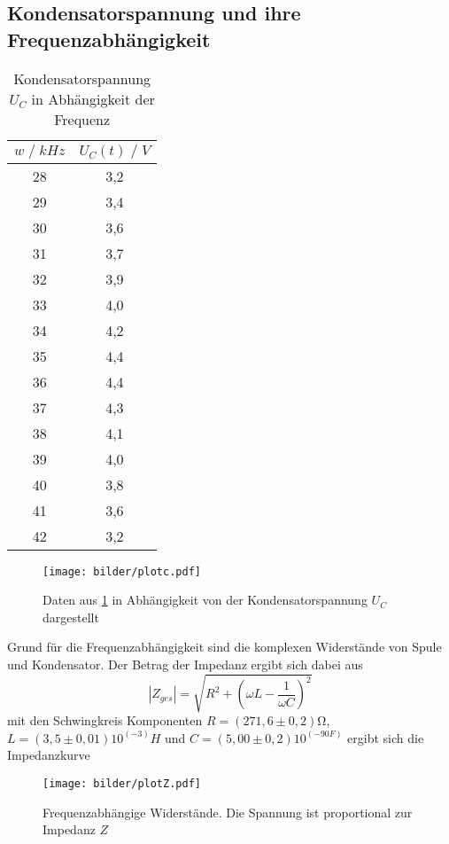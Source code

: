 \subsection{Kondensatorspannung und ihre Frequenzabhängigkeit}
\begin{table}
    \centering
    \begin{tabular}{c c}
        \toprule
        $w\;/\;kHz$ & $U_C(t)\;/\;V$\\
        \midrule
        28      &3,2\\
        29      &3,4\\
        30      &3,6\\
        31      &3,7\\
        32      &3,9\\
        33      &4,0\\
        34      &4,2\\
        35      &4,4\\
        36      &4,4\\
        37      &4,3\\
        38      &4,1\\
        39      &4,0\\
        40      &3,8\\
        41      &3,6\\
        42      &3,2\\
        \bottomrule
    \end{tabular}
    \caption{Kondensatorspannung $U_C$ in Abhängigkeit der Frequenz}
    \label{tab:tabelle_w}
\end{table}
\begin{figure}[H]
    \centering
    \texttt{[image: bilder/plotc.pdf]}
    \caption{
        Daten aus \ref{tab:tabelle_w} in Abhängigkeit von der Kondensatorspannung $U_C$ dargestellt
    }
\end{figure}
Grund für die Frequenzabhängigkeit sind die komplexen Widerstände von Spule und Kondensator.
Der Betrag der Impedanz ergibt sich dabei aus
\begin{equation}
    |Z_{ges}|=\sqrt{R^2+(\omega L-\frac{1}{\omega C})^2}
\end{equation}
mit den Schwingkreis Komponenten $R=(271,6\pm0,2)\si{\ohm}$, $L=(3,5\pm 0,01)10^(-3)H$ und $C=(5,00\pm 0,2)10^(-90F)$ ergibt 
sich die Impedanzkurve
\begin{figure}[H]
    \centering
    \texttt{[image: bilder/plotZ.pdf]}
    \caption{
        Frequenzabhängige Widerstände. Die Spannung ist proportional zur Impedanz $Z$
    }
\end{figure}
\newpage





